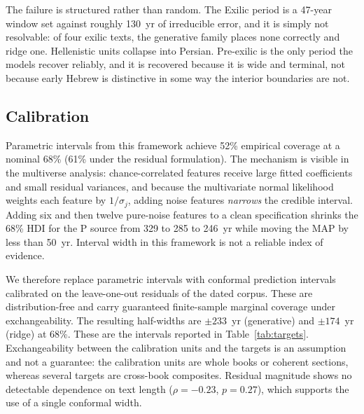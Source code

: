 \documentclass[10pt,letterpaper]{article}
\begin{document}
The failure is structured rather than random.  The Exilic period is a
47-year window set against roughly 130~yr of irreducible error, and it is
simply not resolvable: of four exilic texts, the generative family places
none correctly and ridge one.  Hellenistic units collapse into Persian.
Pre-exilic is the only period the models recover reliably, and it is
recovered because it is wide and terminal, not because early Hebrew is
distinctive in some way the interior boundaries are not.

\subsection*{Calibration}

Parametric intervals from this framework achieve 52\% empirical coverage
at a nominal 68\% (61\% under the residual formulation).  The mechanism is visible in the multiverse analysis:
chance-correlated features receive large fitted coefficients and small
residual variances, and because the multivariate normal likelihood weights
each feature by $1/\sigma_j$, adding noise features \emph{narrows} the
credible interval.  Adding six and then twelve pure-noise features to a
clean specification shrinks the 68\% HDI for the P source from 329 to 285
to 246~yr while moving the MAP by less than 50~yr.  Interval width in this
framework is not a reliable index of evidence.

We therefore replace parametric intervals with conformal prediction
intervals calibrated on the leave-one-out residuals of the dated corpus.
These are distribution-free and carry guaranteed finite-sample marginal
coverage under exchangeability.  The resulting half-widths are $\pm233$~yr
(generative) and $\pm174$~yr (ridge) at 68\%.  These are the intervals
reported in Table~\ref{tab:targets}.  Exchangeability between the
calibration units and the targets is an assumption and not a guarantee:
the calibration units are whole books or coherent sections, whereas several
targets are cross-book composites.  Residual magnitude shows no detectable
dependence on text length ($\rho = -0.23$, $p = 0.27$), which supports the
use of a single conformal width.
\end{document}
